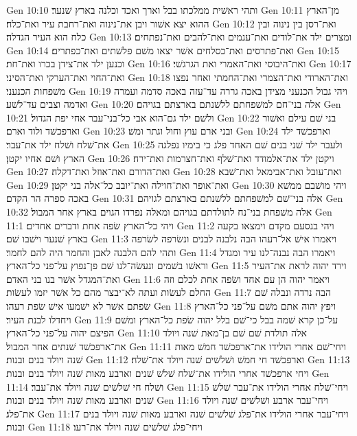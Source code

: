 Gen 10:10  ותהי ראשׁית ממלכתו בבל וארך ואכד וכלנה בארץ שׁנער׃
Gen 10:11  מן־הארץ ההוא יצא אשׁור ויבן את־נינוה ואת־רחבת עיר ואת־כלח׃
Gen 10:12  ואת־רסן בין נינוה ובין כלח הוא העיר הגדלה׃
Gen 10:13  ומצרים ילד את־לודים ואת־ענמים ואת־להבים ואת־נפתחים׃
Gen 10:14  ואת־פתרסים ואת־כסלחים אשׁר יצאו משׁם פלשׁתים ואת־כפתרים׃
Gen 10:15  וכנען ילד את־צידן בכרו ואת־חת׃
Gen 10:16  ואת־היבוסי ואת־האמרי ואת הגרגשׁי׃
Gen 10:17  ואת־החוי ואת־הערקי ואת־הסיני׃
Gen 10:18  ואת־הארודי ואת־הצמרי ואת־החמתי ואחר נפצו משׁפחות הכנעני׃
Gen 10:19  ויהי גבול הכנעני מצידן באכה גררה עד־עזה באכה סדמה ועמרה ואדמה וצבים עד־לשׁע׃
Gen 10:20  אלה בני־חם למשׁפחתם ללשׁנתם בארצתם בגויהם׃
Gen 10:21  ולשׁם ילד גם־הוא אבי כל־בני־עבר אחי יפת הגדול׃
Gen 10:22  בני שׁם עילם ואשׁור וארפכשׁד ולוד וארם׃
Gen 10:23  ובני ארם עוץ וחול וגתר ומשׁ׃
Gen 10:24  וארפכשׁד ילד את־שׁלח ושׁלח ילד את־עבר׃
Gen 10:25  ולעבר ילד שׁני בנים שׁם האחד פלג כי בימיו נפלגה הארץ ושׁם אחיו יקטן׃
Gen 10:26  ויקטן ילד את־אלמודד ואת־שׁלף ואת־חצרמות ואת־ירח׃
Gen 10:27  ואת־הדורם ואת־אוזל ואת־דקלה׃
Gen 10:28  ואת־עובל ואת־אבימאל ואת־שׁבא׃
Gen 10:29  ואת־אופר ואת־חוילה ואת־יובב כל־אלה בני יקטן׃
Gen 10:30  ויהי מושׁבם ממשׁא באכה ספרה הר הקדם׃
Gen 10:31  אלה בני־שׁם למשׁפחתם ללשׁנתם בארצתם לגויהם׃
Gen 10:32  אלה משׁפחת בני־נח לתולדתם בגויהם ומאלה נפרדו הגוים בארץ אחר המבול׃
Gen 11:1  ויהי כל־הארץ שׂפה אחת ודברים אחדים׃
Gen 11:2  ויהי בנסעם מקדם וימצאו בקעה בארץ שׁנער וישׁבו שׁם׃
Gen 11:3  ויאמרו אישׁ אל־רעהו הבה נלבנה לבנים ונשׂרפה לשׂרפה ותהי להם הלבנה לאבן והחמר היה להם לחמר׃
Gen 11:4  ויאמרו הבה נבנה־לנו עיר ומגדל וראשׁו בשׁמים ונעשׂה־לנו שׁם פן־נפוץ על־פני כל־הארץ׃
Gen 11:5  וירד יהוה לראת את־העיר ואת־המגדל אשׁר בנו בני האדם׃
Gen 11:6  ויאמר יהוה הן עם אחד ושׂפה אחת לכלם וזה החלם לעשׂות ועתה לא־יבצר מהם כל אשׁר יזמו לעשׂות׃
Gen 11:7  הבה נרדה ונבלה שׁם שׂפתם אשׁר לא ישׁמעו אישׁ שׂפת רעהו׃
Gen 11:8  ויפץ יהוה אתם משׁם על־פני כל־הארץ ויחדלו לבנת העיר׃
Gen 11:9  על־כן קרא שׁמה בבל כי־שׁם בלל יהוה שׂפת כל־הארץ ומשׁם הפיצם יהוה על־פני כל־הארץ׃
Gen 11:10  אלה תולדת שׁם שׁם בן־מאת שׁנה ויולד את־ארפכשׁד שׁנתים אחר המבול׃
Gen 11:11  ויחי־שׁם אחרי הולידו את־ארפכשׁד חמשׁ מאות שׁנה ויולד בנים ובנות׃
Gen 11:12  וארפכשׁד חי חמשׁ ושׁלשׁים שׁנה ויולד את־שׁלח׃
Gen 11:13  ויחי ארפכשׁד אחרי הולידו את־שׁלח שׁלשׁ שׁנים וארבע מאות שׁנה ויולד בנים ובנות׃
Gen 11:14  ושׁלח חי שׁלשׁים שׁנה ויולד את־עבר׃
Gen 11:15  ויחי־שׁלח אחרי הולידו את־עבר שׁלשׁ שׁנים וארבע מאות שׁנה ויולד בנים ובנות׃
Gen 11:16  ויחי־עבר ארבע ושׁלשׁים שׁנה ויולד את־פלג׃
Gen 11:17  ויחי־עבר אחרי הולידו את־פלג שׁלשׁים שׁנה וארבע מאות שׁנה ויולד בנים ובנות׃
Gen 11:18  ויחי־פלג שׁלשׁים שׁנה ויולד את־רעו׃
